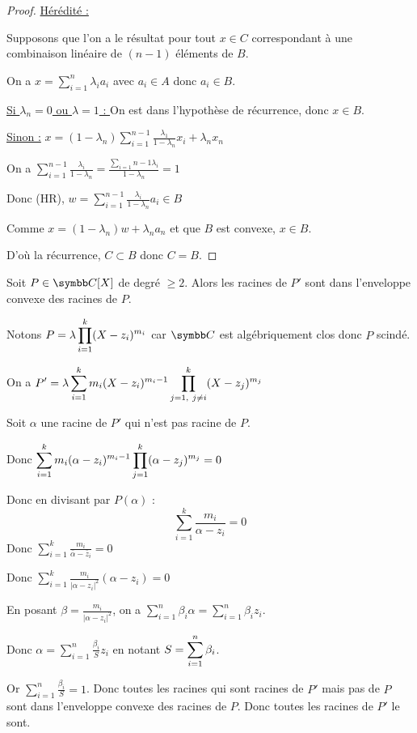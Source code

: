 \begin{proof}
    \uline{Hérédité :}

    Supposons que l'on a le résultat pour tout $x \in C$ correspondant à une combinaison
    linéaire de $(n - 1)$ éléments de $B$. 

    On a $\displaystyle x = \sum_{i = 1}^{n } \lambda_i a_i$ avec $a_i \in A$ donc $a_i \in B$.

    \quad \underline{Si $\lambda_n = 0$ ou $\lambda = 1$ : } On est dans l'hypothèse 
    de récurrence, donc $x \in B$. 

    \quad \underline{Sinon :} $\displaystyle x = (1 - \lambda_n) \sum_{i = 1}^{n - 1} \frac{\lambda_1}{1 - \lambda_n} x_i + \lambda_n x_n$

    On a $\displaystyle \sum_{i = 1}^{n - 1} \frac{\lambda_i}{1 - \lambda_n} = \frac{\sum_{i = 1}{n - 1} \lambda_i}{1 - \lambda_n} = 1$

    Donc (HR), $\displaystyle w = \sum_{i = 1}^{n-1} \frac{\lambda_i}{1 - \lambda_n} a_i \in B$

    Comme $\displaystyle x = (1 - \lambda_n)w + \lambda_n a_n$ et que $B$ est convexe, $x \in B$. 

    D'où la récurrence, $C \subset B$ donc $C = B$. 
\end{proof}

\begin{exemple}
    Soit $P \in \C[X]$ de degré $\geqslant 2$. Alors les racines de $P'$ sont dans 
    l'enveloppe convexe des racines de $P$. 

    Notons $\displaystyle P = \lambda \prod_{i = 1}^{k}(X - z_i)^{m_i}$ car $\C$ est algébriquement clos
    donc $P$ scindé. 

    On a $\displaystyle P' = \lambda \sum_{i = 1}^{k} m_i (X - z_i)^{m_i - 1} \prod_{j = 1,~j\not= i}^{k}(X - z_j)^{m_j}$

    Soit $\alpha$ une racine de $P'$ qui n'est pas racine de $P$.

    Donc $\displaystyle \sum_{i = 1}^{k }m_i(\alpha - z_i)^{m_i - 1} \prod_{j = 1}^{k } (\alpha - z_j)^{m_j} = 0$

    Donc en divisant par $P(\alpha)$ : 
    \[\sum_{i = 1}^{k } \frac{m_i}{\alpha - z_i} = 0\]
    Donc $\displaystyle \sum_{i = 1}^{k} \frac{m_i}{\bar \alpha - \bar z_i} = 0$
    
    Donc $\displaystyle \sum_{i = 1}^{k}\frac{m_i }{|\alpha - z_i|^2} (\alpha - z_i) = 0$
    
    En posant $\beta = \frac{m_i}{|\alpha - z_i|^2}$, on a
    $\displaystyle \sum_{i = 1}^{n}\beta_i \alpha = \sum_{i = 1}^{n} \beta_i z_i$.

    Donc $\displaystyle \alpha = \sum_{i = 1}^{n}\frac{\beta_i}{S} z_i$ en notant $\displaystyle S = \sum_{i=1}^n \beta_i$.

    Or $\displaystyle \sum_{i = 1}^{n }\frac{\beta_i }{S} = 1$.
    Donc toutes les racines qui sont racines de $P'$ mais pas de $P$ sont dans l'enveloppe convexe des racines de $P$.
    Donc toutes les racines de $P'$ le sont.
\end{exemple}

